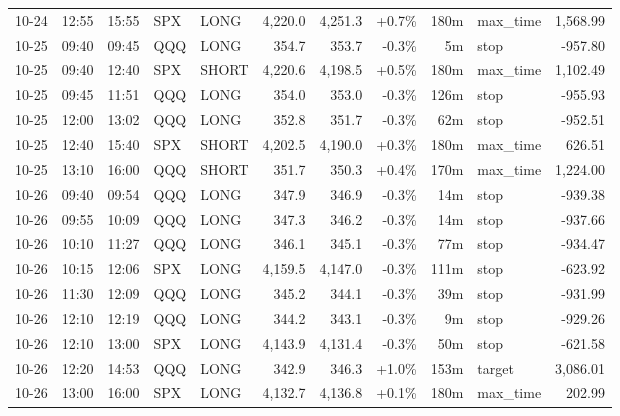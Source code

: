 \documentclass[11pt,a4paper,twoside]{article}
\begin{document}
\begin{center}
\begin{longtable}{>{\color{txtmain}}l l l l l r r r r >{\color{txtmain}}l r}
10-24 & 12:55 & 15:55 & SPX & LONG & 4,220.0 & 4,251.3 & \textcolor{wingreen}{+0.7\%} & 180m & max\_time & \textcolor{wingreen}{1,568.99} \\
10-25 & 09:40 & 09:45 & QQQ & LONG & 354.7 & 353.7 & \textcolor{lossred}{-0.3\%} & 5m & stop & \textcolor{lossred}{-957.80} \\
10-25 & 09:40 & 12:40 & SPX & SHORT & 4,220.6 & 4,198.5 & \textcolor{wingreen}{+0.5\%} & 180m & max\_time & \textcolor{wingreen}{1,102.49} \\
10-25 & 09:45 & 11:51 & QQQ & LONG & 354.0 & 353.0 & \textcolor{lossred}{-0.3\%} & 126m & stop & \textcolor{lossred}{-955.93} \\
10-25 & 12:00 & 13:02 & QQQ & LONG & 352.8 & 351.7 & \textcolor{lossred}{-0.3\%} & 62m & stop & \textcolor{lossred}{-952.51} \\
10-25 & 12:40 & 15:40 & SPX & SHORT & 4,202.5 & 4,190.0 & \textcolor{wingreen}{+0.3\%} & 180m & max\_time & \textcolor{wingreen}{626.51} \\
10-25 & 13:10 & 16:00 & QQQ & SHORT & 351.7 & 350.3 & \textcolor{wingreen}{+0.4\%} & 170m & max\_time & \textcolor{wingreen}{1,224.00} \\
10-26 & 09:40 & 09:54 & QQQ & LONG & 347.9 & 346.9 & \textcolor{lossred}{-0.3\%} & 14m & stop & \textcolor{lossred}{-939.38} \\
10-26 & 09:55 & 10:09 & QQQ & LONG & 347.3 & 346.2 & \textcolor{lossred}{-0.3\%} & 14m & stop & \textcolor{lossred}{-937.66} \\
10-26 & 10:10 & 11:27 & QQQ & LONG & 346.1 & 345.1 & \textcolor{lossred}{-0.3\%} & 77m & stop & \textcolor{lossred}{-934.47} \\
10-26 & 10:15 & 12:06 & SPX & LONG & 4,159.5 & 4,147.0 & \textcolor{lossred}{-0.3\%} & 111m & stop & \textcolor{lossred}{-623.92} \\
10-26 & 11:30 & 12:09 & QQQ & LONG & 345.2 & 344.1 & \textcolor{lossred}{-0.3\%} & 39m & stop & \textcolor{lossred}{-931.99} \\
10-26 & 12:10 & 12:19 & QQQ & LONG & 344.2 & 343.1 & \textcolor{lossred}{-0.3\%} & 9m & stop & \textcolor{lossred}{-929.26} \\
10-26 & 12:10 & 13:00 & SPX & LONG & 4,143.9 & 4,131.4 & \textcolor{lossred}{-0.3\%} & 50m & stop & \textcolor{lossred}{-621.58} \\
10-26 & 12:20 & 14:53 & QQQ & LONG & 342.9 & 346.3 & \textcolor{wingreen}{+1.0\%} & 153m & target & \textcolor{wingreen}{3,086.01} \\
10-26 & 13:00 & 16:00 & SPX & LONG & 4,132.7 & 4,136.8 & \textcolor{wingreen}{+0.1\%} & 180m & max\_time & \textcolor{wingreen}{202.99} \\

\end{longtable}
\end{center}
\end{document}
